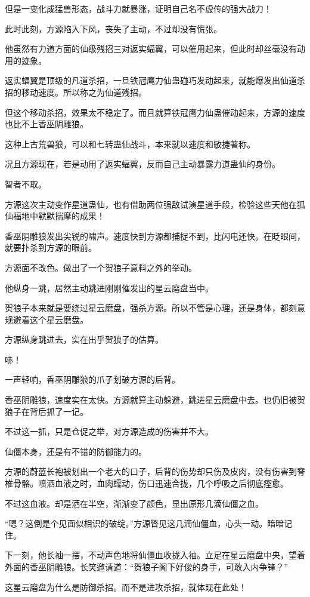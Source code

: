 \begin{this_body}
但是一变化成猛兽形态，战斗力就暴涨，证明自己名不虚传的强大战力！

此时此刻，方源陷入下风，丧失了主动，不过却没有慌张。

他虽然有力道方面的仙级残招三对返实蝠翼，可以催用起来，但此时却丝毫没有动用的迹象。

返实蝠翼是顶级的凡道杀招，一旦铁冠鹰力仙蛊碰巧发动起来，就能爆发出仙道杀招的移动速度。所以称之为仙道残招。

但这个移动杀招，效果太不稳定了。而且就算铁冠鹰力仙蛊催动起来，方源的速度也比不上香巫阴雕狼。

这种上古荒兽狼，可以和七转蛊仙战斗，本来就以速度和敏捷著称。

况且方源现在，若是动用了返实蝠翼，反而自己主动暴露力道蛊仙的身份。

智者不取。

方源这次主动变作星道蛊仙，也有借助两位强敌试演星道手段，检验这些天他在狐仙福地中默默揣摩的成果！

香巫阴雕狼发出尖锐的啸声。速度快到方源都捕捉不到，比闪电还快。在眨眼间，就要扑杀到方源的眼前。

方源面不改色。做出了一个贺狼子意料之外的举动。

他纵身一跳，居然主动跳进刚刚催发出的星云磨盘当中。

贺狼子本来就是要绕过星云磨盘，强杀方源。所以不管是心理，还是身体，都刻意规避着这个星云磨盘。

方源纵身跳进去，实在出乎贺狼子的估算。

哧！

一声轻响，香巫阴雕狼的爪子划破方源的后背。

香巫阴雕狼，速度实在太快。方源就算主动躲避，跳进星云磨盘中去。也仍旧被贺狼子在背后抓了一记。

不过这一抓，只是仓促之举，对方源造成的伤害并不大。

仙僵本身，还是有不错的防御能力的。

方源的蔚蓝长袍被划出一个老大的口子，后背的伤势却只伤及皮肉，没有伤害到脊椎骨骼。喷洒血液之时，血肉蠕动，伤口迅速合拢，几个呼吸之后彻底痊愈。

不过这血液。却是洒在半空，渐渐变了颜色，显出原形几滴仙僵之血。

“嗯？这倒是个见面似相识的破绽。”方源瞥见这几滴仙僵血，心头一动。暗暗记住。

下一刻，他长袖一摆，不动声色地将仙僵血收拢入袖。立足在星云磨盘中央，望着外面的香巫阴雕狼。长笑邀请道：“贺狼子阁下好俊的身手，可敢入内争锋？”

这星云磨盘为什么是防御杀招。而不是进攻杀招，就体现在此处！


\end{this_body}
